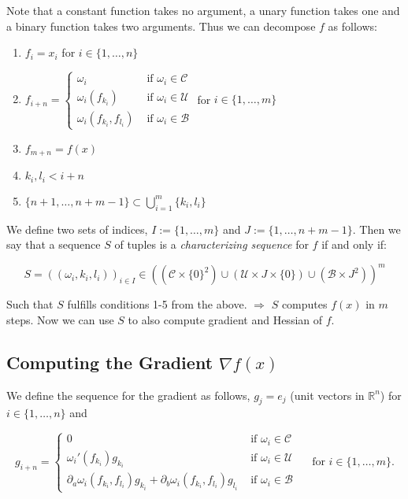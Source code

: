 \documentclass[11pt,a4paper]{article}
\def\R{{\mathbb R}}
\theoremstyle{definition} %
\begin{document}
Note that a constant function takes no argument, a unary function takes one
and a binary function takes two arguments.
Thus we can decompose $f$ as follows:

\begin{enumerate}[(1)]
	\item $f_i = x_i$ for $i \in \{
		      1, \ldots, n
		      \} $
	\item $f_{i + n} = \begin{cases}
			      \omega_i                    & \text{ if } \omega_i \in \mathcal{C} \\
			      \omega_i (f_{k_i})          & \text{ if } \omega_i \in \mathcal{U} \\
			      \omega_i (f_{k_i}, f_{l_i}) & \text{ if } \omega_i \in \mathcal{B}
		      \end{cases}$
	      \qquad for $i \in \{
		      1, \ldots, m
		      \}$
	\item $f_{m + n} = f(x)$
	\item $k_i, l_i < i + n$  
	\item $\{
		      n+1, \ldots, n+m - 1
		      \} \subset \bigcup_{i=1}^{m} \{
		      k_i, l_i
		      \}$
\end{enumerate}

We define two sets of indices, $I := \{
	1, \ldots, m
	\} $ and $J := \{
	1, \ldots, n+m-1
	\} $.
Then we say that a sequence $S$ of tuples is a \textit{characterizing sequence}
for $f$ if and only if:

\[
	S = \left(
	(\omega_i, k_i, l_i)
	\right)_{i \in I}
	\in \left(
	\left(
		\mathcal{C} \times \{
		0
		\}^2
		\right) \cup
	\left(
		\mathcal{U} \times J \times \{
		0
		\} \right) \cup
	\left(
		\mathcal{B} \times J^2
		\right)
	\right) ^m
\]

Such that $S$ fulfills conditions 1-5 from the above.
$\Rightarrow$ $S$ computes $f(x)$ in $m$ steps.
Now we can use $S$ to also compute gradient and Hessian of $f$.

\subsection{Computing the Gradient $\nabla f(x)$}

We define the sequence for the gradient as follows,
$g_j = e_j$ (unit vectors in $\R^n$) for $i \in \{
	1, \ldots, n
	\} $ and

\[
	g_{i+n} = \begin{cases}
		0
		 & \text{ if } \omega_i \in \mathcal{C} \\
		\omega_i ' (f_{k_i}) g_{k_i}
		 & \text{ if } \omega_i \in \mathcal{U} \\
		\partial_a \omega_i (f_{k_i}, f_{l_i}) g_{k_i}
		+ \partial_b \omega_i (f_{k_i}, f_{l_i}) g_{l_i}
		 & \text{ if } \omega_i \in \mathcal{B}
	\end{cases} \quad \text{ for }
	i \in \{
	1, \ldots, m
	\}.
\]
\end{document}
